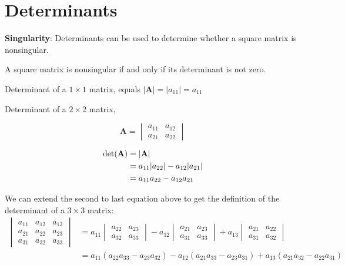 \documentclass[
  letterpaper,
]{book}
\theoremstyle{definition}
\theoremstyle{definition}
\theoremstyle{plain}
\theoremstyle{definition}
\theoremstyle{plain}
\theoremstyle{plain}
\theoremstyle{remark}
\begin{document}
\hypertarget{determinants}{%
\section{Determinants}\label{determinants}}

\textbf{Singularity}: Determinants can be used to determine whether a
square matrix is nonsingular.

A square matrix is nonsingular if and only if its determinant is not
zero.

Determinant of a \(1 \times 1\) matrix, equals
\(|\mathbf{A}|=|a_{11}|=a_{11}\)

Determinant of a \(2 \times 2\) matrix,

\[\mathbf{A}=\begin{vmatrix} a_{11}&a_{12}\\ a_{21}&a_{22} \end{vmatrix}\]

\[\begin{align*}\det({\bf A}) &= |{\bf A}|\\
            &= a_{11}|a_{22}| - a_{12}|a_{21}|\\
            &= a_{11}a_{22} - a_{12}a_{21}
  \end{align*}\]

We can extend the second to last equation above to get the definition of
the determinant of a \(3 \times 3\) matrix: \[\begin{align*}
            \begin{vmatrix} a_{11}&a_{12}&a_{13}\\  a_{21} & a_{22}&a_{23}\\ a_{31}&a_{32}&a_{33} \end{vmatrix} 
                &= 
                a_{11} \begin{vmatrix} a_{22}&a_{23}\\ a_{32}&a_{33} \end{vmatrix}
                - a_{12} \begin{vmatrix} a_{21}&a_{23}\\ a_{31}&a_{33} \end{vmatrix}
                + a_{13} \begin{vmatrix} a_{21}&a_{22}\\ a_{31}&a_{32} 
                \end{vmatrix}\\
                &= a_{11}(a_{22}a_{33} - a_{23}a_{32}) - a_{12}(a_{21}a_{33} - a_{23}a_{31}) + a_{13}(a_{21}a_{32} - a_{22}a_{31})
  \end{align*} \]
\end{document}
